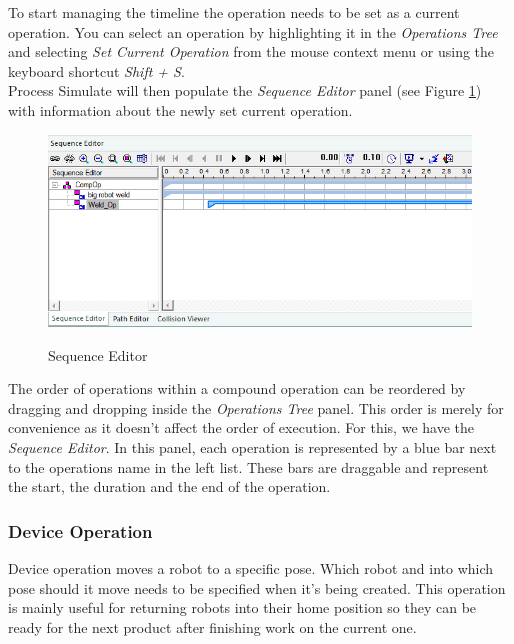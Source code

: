To start managing the timeline the operation needs to be set as a current operation. 
You can select an operation by highlighting it in the \emph{Operations Tree} and selecting \emph{Set Current Operation} from the mouse context menu or using the keyboard shortcut \emph{Shift + S}. \\

Process Simulate will then populate the \emph{Sequence Editor} panel (see Figure \ref{fig:SequenceEditor}) with information about the newly set current operation. \\

\begin{figure}[H]
    \caption{Sequence Editor}
    \centering
    \includegraphics[width=\textwidth]{sequence_editor}
    \label{fig:SequenceEditor}
\end{figure}

The order of operations within a compound operation can be reordered by dragging and dropping inside the \emph{Operations Tree} panel.
This order is merely for convenience as it doesn't affect the order of execution.
For this, we have the \emph{Sequence Editor}. 
In this panel, each operation is represented by a blue bar next to the operations name in the left list. 
These bars are draggable and represent the start, the duration and the end of the operation. \\

\subsubsection{Device Operation}
Device operation moves a robot to a specific pose.
Which robot and into which pose should it move needs to be specified when it's being created.
This operation is mainly useful for returning robots into their home position so they can be ready for the next product after finishing work on the current one. \\

